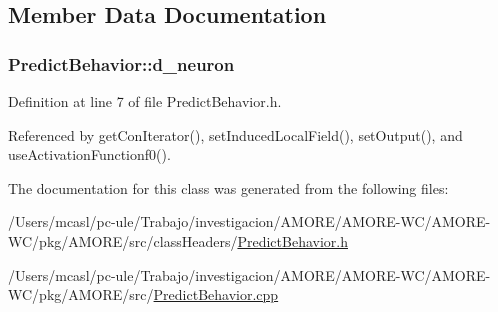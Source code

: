 \subsection{Member Data Documentation}
\hypertarget{class_predict_behavior_a49a9daba3c9e798fc7815ac44b645dc0}{
\subsubsection[{d\_\-neuron}]{ {\bf PredictBehavior::d\_\-neuron}}}
\label{class_predict_behavior_a49a9daba3c9e798fc7815ac44b645dc0}


Definition at line 7 of file PredictBehavior.h.



Referenced by getConIterator(), setInducedLocalField(), setOutput(), and useActivationFunctionf0().



The documentation for this class was generated from the following files:\begin{DoxyCompactItemize}
\item 
/Users/mcasl/pc-\/ule/Trabajo/investigacion/AMORE/AMORE-\/WC/AMORE-\/WC/pkg/AMORE/src/classHeaders/\hyperlink{_predict_behavior_8h}{PredictBehavior.h}\item 
/Users/mcasl/pc-\/ule/Trabajo/investigacion/AMORE/AMORE-\/WC/AMORE-\/WC/pkg/AMORE/src/\hyperlink{_predict_behavior_8cpp}{PredictBehavior.cpp}\end{DoxyCompactItemize}

